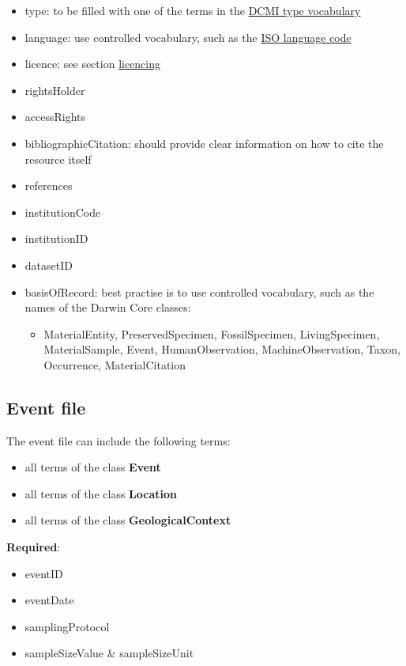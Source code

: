 \documentclass[
  oneside]{book}
\providecommand{\tightlist}{%
  \setlength{\itemsep}{0pt}\setlength{\parskip}{0pt}}
\begin{document}
\begin{itemize}
\item
  type: to be filled with one of the terms in the \href{https://www.dublincore.org/specifications/dublin-core/dcmi-terms/\#section-7}{DCMI type vocabulary}
\item
  language: use controlled vocabulary, such as the \href{https://www.w3schools.com/tags/ref_language_codes.asp}{ISO language code}
\item
  licence: see section \hyperref[Licencing]{licencing}
\item
  rightsHolder
\item
  accessRights
\item
  bibliographicCitation: should provide clear information on how to cite the resource itself
\item
  references
\item
  institutionCode
\item
  institutionID
\item
  datasetID
\item
  basisOfRecord: best practise is to use controlled vocabulary, such as the names of the Darwin Core classes:

  \begin{itemize}
  \tightlist
  \item
    MaterialEntity, PreservedSpecimen, FossilSpecimen, LivingSpecimen, MaterialSample, Event, HumanObservation, MachineObservation, Taxon, Occurrence, MaterialCitation
  \end{itemize}
\end{itemize}

\subsection{Event file}\label{event-file}

The event file can include the following terms:

\begin{itemize}
\tightlist
\item
  all terms of the class \textbf{Event}
\item
  all terms of the class \textbf{Location}
\item
  all terms of the class \textbf{GeologicalContext}
\end{itemize}

\textbf{Required}:

\begin{itemize}
\item
  eventID
\item
  eventDate
\item
  samplingProtocol
\item
  sampleSizeValue {\&} sampleSizeUnit
\end{itemize}
\end{document}
